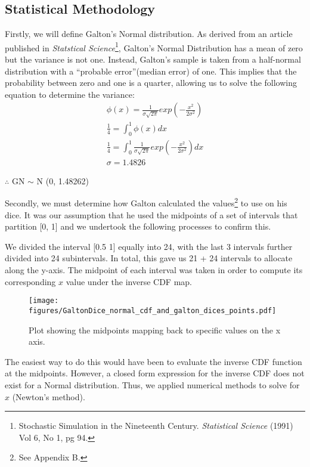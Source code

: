 \subsection{Statistical Methodology}
Firstly, we will define Galton's Normal distribution. As derived from an article published in \textit{Statstical Science}\footnote[1]{Stochastic Simulation in the Nineteenth Century. {\it Statistical Science} (1991) Vol 6, No 1, pg 94.}, Galton's Normal Distribution has a mean of zero but the variance is not one. Instead, Galton's sample is taken from a half-normal distribution with a \textquotedblleft probable error\textquotedblright (median error) of one. This implies that the probability between zero and one is a quarter, allowing us to solve the following equation to determine the variance: 
\begin{displaymath}
\begin{array}{l}
\phi(x)=\frac{1}{\sigma\sqrt{2\pi}}exp(-\frac{x^2}{2\sigma^2})\\
\frac{1}{4}=\int_0^1\phi(x)dx\\
\frac{1}{4}=\int_0^1\frac{1}{\sigma\sqrt{2\pi}}exp(-\frac{x^2}{2\sigma^2})dx\\
\sigma=1.4826
\end{array}
\end{displaymath}

$ \therefore $ GN $\sim$ N (0, 1.48262)

Secondly, we must determine how Galton calculated the values\footnote[2]{See Appendix B.} to use on his dice. It was our assumption that he used the midpoints of a set of intervals that partition [0, 1] and we undertook the following processes to confirm this. 

We divided the interval [0.5 1] equally into 24, with the last 3 intervals further divided into 24 subintervals. In total, this gave us 21 + 24 intervals to allocate along the y-axis. The midpoint of each interval was taken in order to compute its corresponding $x$ value under the inverse CDF map.

\begin{figure}[thp]
\begin{center}
\texttt{[image: figures/GaltonDice\_normal\_cdf\_and\_galton\_dices\_points.pdf]}
\caption{Plot showing the midpoints mapping back to specific values on the x axis.}
\end{center}
\end{figure}

The easiest way to do this would have been to evaluate the inverse CDF function at the midpoints. However, a closed form expression for the inverse CDF does not exist for a Normal distribution. Thus, we applied numerical methods to solve for $x$ (Newton's method).  

